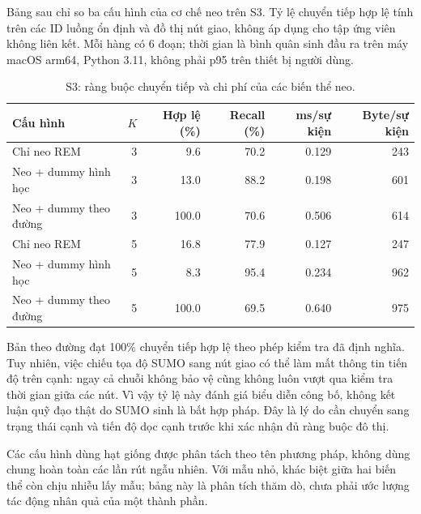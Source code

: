 Bảng sau chỉ so ba cấu hình của cơ chế neo trên S3. Tỷ lệ chuyển tiếp hợp lệ tính trên các ID luồng ổn định và đồ thị nút giao, không áp dụng cho tập ứng viên không liên kết. Mỗi hàng có 6 đoạn; thời gian là bình quân sinh đầu ra trên máy macOS arm64, Python 3.11, không phải p95 trên thiết bị người dùng.

\begin{table}[H]\centering\small\setlength{\tabcolsep}{4pt}

\caption{S3: ràng buộc chuyển tiếp và chi phí của các biến thể neo.}

\begin{tabular}{p{4.3cm}rrrrr}\toprule

Cấu hình & $K$ & Hợp lệ (\%) & Recall (\%) & ms/sự kiện & Byte/sự kiện\\\midrule

Chỉ neo REM & 3 & 9.6 & 70.2 & 0.129 & 243\\

Neo + dummy hình học & 3 & 13.0 & 88.2 & 0.198 & 601\\

Neo + dummy theo đường & 3 & 100.0 & 70.6 & 0.506 & 614\\

Chỉ neo REM & 5 & 16.8 & 77.9 & 0.127 & 247\\

Neo + dummy hình học & 5 & 8.3 & 95.4 & 0.234 & 962\\

Neo + dummy theo đường & 5 & 100.0 & 69.5 & 0.640 & 975\\

\bottomrule\end{tabular}\end{table}

Bản theo đường đạt 100\% chuyển tiếp hợp lệ theo phép kiểm tra đã định nghĩa. Tuy nhiên, việc chiếu tọa độ SUMO sang nút giao có thể làm mất thông tin tiến độ trên cạnh: ngay cả chuỗi không bảo vệ cũng không luôn vượt qua kiểm tra thời gian giữa các nút. Vì vậy tỷ lệ này đánh giá biểu diễn công bố, không kết luận quỹ đạo thật do SUMO sinh là bất hợp pháp. Đây là lý do cần chuyển sang trạng thái cạnh và tiến độ dọc cạnh trước khi xác nhận đủ ràng buộc đô thị.

Các cấu hình dùng hạt giống được phân tách theo tên phương pháp, không dùng chung hoàn toàn các lần rút ngẫu nhiên. Với mẫu nhỏ, khác biệt giữa hai biến thể còn chịu nhiễu lấy mẫu; bảng này là phân tích thăm dò, chưa phải ước lượng tác động nhân quả của một thành phần.

